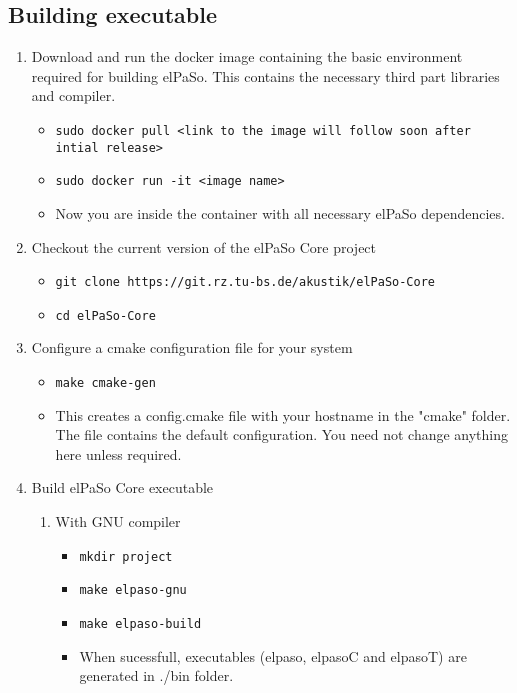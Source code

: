 \subsection{Building executable}
\begin{enumerate}
    \item Download and run the docker image containing the basic environment required for building elPaSo. This contains the necessary third part libraries and compiler.
    \begin{itemize}
        \item \texttt{sudo docker pull <link to the image will follow soon after intial release>}
        \item \texttt{sudo docker run -it <image name>}
        \item Now you are inside the container with all necessary elPaSo dependencies.
    \end{itemize}
    \item Checkout the current version of the elPaSo Core project
    \begin{itemize}
        \item \texttt{git clone https://git.rz.tu-bs.de/akustik/elPaSo-Core}
        \item \texttt{cd elPaSo-Core}
    \end{itemize}
    \item Configure a cmake configuration file for your system
    \begin{itemize}
        \item \texttt{make cmake-gen}
        \item This creates a config.cmake file with your hostname in the "cmake" folder. The file contains the default configuration. You need not change anything here unless required.
    \end{itemize}
    \item Build elPaSo Core executable
    \begin{enumerate}
        \item With GNU compiler
        \begin{itemize}
            \item \texttt{mkdir project}
            \item \texttt{make elpaso-gnu}
            \item \texttt{make elpaso-build}
            \item When sucessfull, executables (elpaso, elpasoC and elpasoT) are generated in ./bin folder. 
        \end{itemize}

\end{enumerate}
\end{enumerate}
